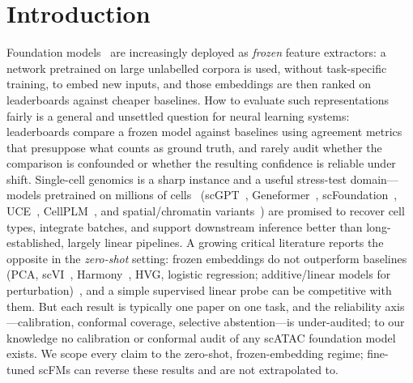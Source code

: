 \documentclass[11pt]{article}
\begin{document}
\section{Introduction}
Foundation models~\cite{vaswani2017,bommasani2021} are increasingly deployed as \emph{frozen} feature extractors: a network pretrained on large unlabelled corpora is used, without task-specific training, to embed new inputs, and those embeddings are then ranked on leaderboards against cheaper baselines. How to evaluate such representations fairly is a general and unsettled question for neural learning systems: leaderboards compare a frozen model against baselines using agreement metrics that presuppose what counts as ground truth, and rarely audit whether the comparison is confounded or whether the resulting confidence is reliable under shift. Single-cell genomics is a sharp instance and a useful stress-test domain---models pretrained on millions of cells~\cite{regev2017hca,tabulasapiens2022} (scGPT~\cite{scgpt2024}, Geneformer~\cite{geneformer2023}, scFoundation~\cite{scfoundation2024}, UCE~\cite{uce2023}, CellPLM~\cite{cellplm2024}, and spatial/chromatin variants~\cite{nicheformer2025,chromfound2025,atacformer2024}) are promised to recover cell types, integrate batches, and support downstream inference better than long-established, largely linear pipelines. A growing critical literature reports the opposite in the \emph{zero-shot} setting: frozen embeddings do not outperform baselines (PCA, scVI~\cite{lopez2018}, Harmony~\cite{korsunsky2019harmony}, HVG, logistic regression; additive/linear models for perturbation)~\cite{kedzierska2025}, and a simple supervised linear probe can be competitive with them. But each result is typically one paper on one task, and the reliability axis---calibration, conformal coverage, selective abstention---is under-audited; to our knowledge no calibration or conformal audit of any scATAC foundation model exists. We scope every claim to the zero-shot, frozen-embedding regime; fine-tuned scFMs can reverse these results and are not extrapolated to.
\end{document}
